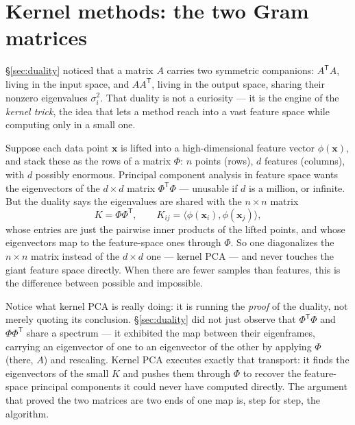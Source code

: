 \documentclass[11pt]{article}
\numberwithin{equation}{section}
\newcommand{\T}{^{\mathsf{T}}}
\newcommand{\ip}[2]{\langle #1, #2 \rangle}
\theoremstyle{plainish}
\begin{document}
\section{Kernel methods: the two Gram matrices}
\label{sec:kernel}

\S\ref{sec:duality} noticed that a matrix $A$ carries two symmetric
companions: $A\T A$, living in the input space, and $AA\T$, living in the output
space, sharing their nonzero eigenvalues $\sigma_i^2$. That duality is not a
curiosity --- it is the engine of the \emph{kernel trick}, the idea that lets a
method reach into a vast feature space while computing only in a small one.

Suppose each data point $\mathbf{x}$ is lifted into a high-dimensional feature
vector $\phi(\mathbf{x})$, and stack these as the rows of a matrix $\Phi$: $n$
points (rows), $d$ features (columns), with $d$ possibly enormous. Principal
component analysis in feature space wants the eigenvectors of the $d \times d$
matrix $\Phi\T\Phi$ --- unusable if $d$ is a million, or infinite. But the
duality says the eigenvalues are shared with the $n \times n$ matrix
\begin{equation}K = \Phi\Phi\T, \qquad K_{ij} = \ip{\phi(\mathbf{x}_i)}{\phi(\mathbf{x}_j)},
\end{equation}
whose entries are just the pairwise inner products of the lifted points, and
whose eigenvectors map to the feature-space ones through $\Phi$. So one
diagonalizes the $n \times n$ matrix instead of the $d \times d$ one --- kernel
PCA --- and never touches the giant feature space directly. When there are fewer
samples than features, this is the difference between possible and impossible.

Notice what kernel PCA is really doing: it is running the \emph{proof} of the
duality, not merely quoting its conclusion. \S\ref{sec:duality} did not just
observe that $\Phi\T\Phi$ and $\Phi\Phi\T$ share a spectrum --- it exhibited the
map between their eigenframes, carrying an eigenvector of one to an eigenvector
of the other by applying $\Phi$ (there, $A$) and rescaling. Kernel PCA executes
exactly that transport: it finds the eigenvectors of the small $K$ and pushes
them through $\Phi$ to recover the feature-space principal components it could
never have computed directly. The argument that proved the two matrices are two
ends of one map is, step for step, the algorithm.
\end{document}
